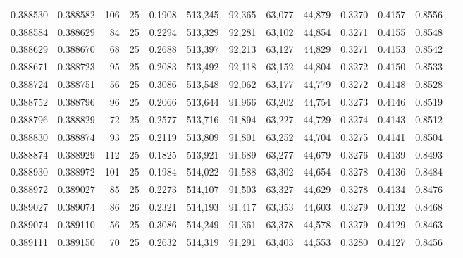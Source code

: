 \begin{tabular}{rrrrrrrrrrrrr}
0.388530 & 0.388582 &   106 &  25 &                                     0.1908 & 513,245 &  92,365 &  63,077 &  44,879 & 0.3270 & 0.4157 & 0.8556 \\
0.388584 & 0.388629 &    84 &  25 &                                     0.2294 & 513,329 &  92,281 &  63,102 &  44,854 & 0.3271 & 0.4155 & 0.8548 \\
0.388629 & 0.388670 &    68 &  25 &                                     0.2688 & 513,397 &  92,213 &  63,127 &  44,829 & 0.3271 & 0.4153 & 0.8542 \\
0.388671 & 0.388723 &    95 &  25 &                                     0.2083 & 513,492 &  92,118 &  63,152 &  44,804 & 0.3272 & 0.4150 & 0.8533 \\
0.388724 & 0.388751 &    56 &  25 &                                     0.3086 & 513,548 &  92,062 &  63,177 &  44,779 & 0.3272 & 0.4148 & 0.8528 \\
0.388752 & 0.388796 &    96 &  25 &                                     0.2066 & 513,644 &  91,966 &  63,202 &  44,754 & 0.3273 & 0.4146 & 0.8519 \\
0.388796 & 0.388829 &    72 &  25 &                                     0.2577 & 513,716 &  91,894 &  63,227 &  44,729 & 0.3274 & 0.4143 & 0.8512 \\
0.388830 & 0.388874 &    93 &  25 &                                     0.2119 & 513,809 &  91,801 &  63,252 &  44,704 & 0.3275 & 0.4141 & 0.8504 \\
0.388874 & 0.388929 &   112 &  25 &                                     0.1825 & 513,921 &  91,689 &  63,277 &  44,679 & 0.3276 & 0.4139 & 0.8493 \\
0.388930 & 0.388972 &   101 &  25 &                                     0.1984 & 514,022 &  91,588 &  63,302 &  44,654 & 0.3278 & 0.4136 & 0.8484 \\
0.388972 & 0.389027 &    85 &  25 &                                     0.2273 & 514,107 &  91,503 &  63,327 &  44,629 & 0.3278 & 0.4134 & 0.8476 \\
0.389027 & 0.389074 &    86 &  26 &                                     0.2321 & 514,193 &  91,417 &  63,353 &  44,603 & 0.3279 & 0.4132 & 0.8468 \\
0.389074 & 0.389110 &    56 &  25 &                                     0.3086 & 514,249 &  91,361 &  63,378 &  44,578 & 0.3279 & 0.4129 & 0.8463 \\
0.389111 & 0.389150 &    70 &  25 &                                     0.2632 & 514,319 &  91,291 &  63,403 &  44,553 & 0.3280 & 0.4127 & 0.8456 \\

\end{tabular}
